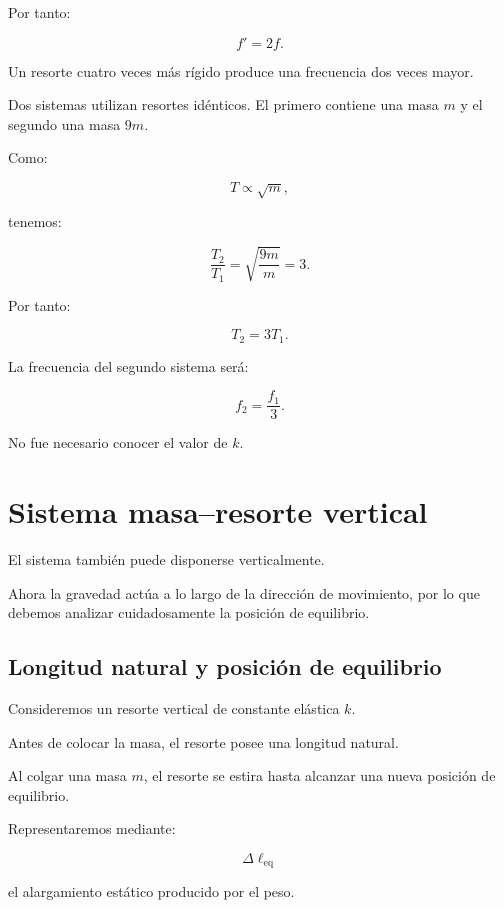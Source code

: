 Por tanto:

\[ f'=2f. \]

Un resorte cuatro veces más rígido produce una frecuencia dos veces mayor.

\begin{ejemplo}
Dos sistemas utilizan resortes idénticos. El primero contiene una masa \(m\) y el segundo una masa \(9m\).

Como:

\[ T\propto\sqrt{m}, \]

tenemos:

\[
\frac{T_2}{T_1}
=
\sqrt{\frac{9m}{m}}
=
3.
\]

Por tanto:

\[ \boxed{T_2=3T_1}. \]

La frecuencia del segundo sistema será:

\[ \boxed{f_2=\frac{f_1}{3}}. \]

No fue necesario conocer el valor de \(k\).
\end{ejemplo}


\section{Sistema masa--resorte vertical}

El sistema también puede disponerse verticalmente.

Ahora la gravedad actúa a lo largo de la dirección de movimiento, por lo que debemos analizar cuidadosamente la posición de equilibrio.


\subsection{Longitud natural y posición de equilibrio}

Consideremos un resorte vertical de constante elástica \(k\).

Antes de colocar la masa, el resorte posee una longitud natural.

Al colgar una masa \(m\), el resorte se estira hasta alcanzar una nueva posición de equilibrio.

Representaremos mediante:

\[ \Delta\ell_{\mathrm{eq}} \]

el alargamiento estático producido por el peso.

